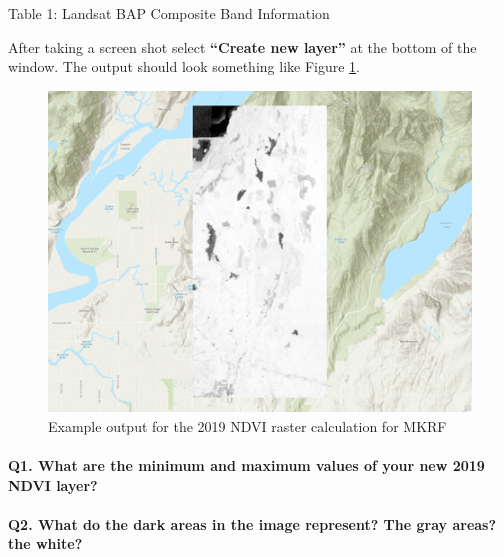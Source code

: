 \documentclass[
]{book}
\begin{document}
Table 1: Landsat BAP Composite Band Information

After taking a screen shot select \textbf{``Create new layer''} at the bottom of the window. The output should look something like Figure \ref{fig:07-example-output-ndvi-calculation}.

\begin{figure}

{\centering \includegraphics[width=0.7\linewidth]{images/07-example-output-ndvi-calculation} 

}

\caption{Example output for the 2019 NDVI raster calculation for MKRF }\label{fig:07-example-output-ndvi-calculation}
\end{figure}

\hypertarget{q1.-what-are-the-minimum-and-maximum-values-of-your-new-2019-ndvi-layer}{%
\paragraph*{Q1. What are the minimum and maximum values of your new 2019 NDVI layer?}\label{q1.-what-are-the-minimum-and-maximum-values-of-your-new-2019-ndvi-layer}}

\hypertarget{q2.-what-do-the-dark-areas-in-the-image-represent-the-gray-areas-the-white}{%
\paragraph*{Q2. What do the dark areas in the image represent? The gray areas? the white?}\label{q2.-what-do-the-dark-areas-in-the-image-represent-the-gray-areas-the-white}}
\end{document}
